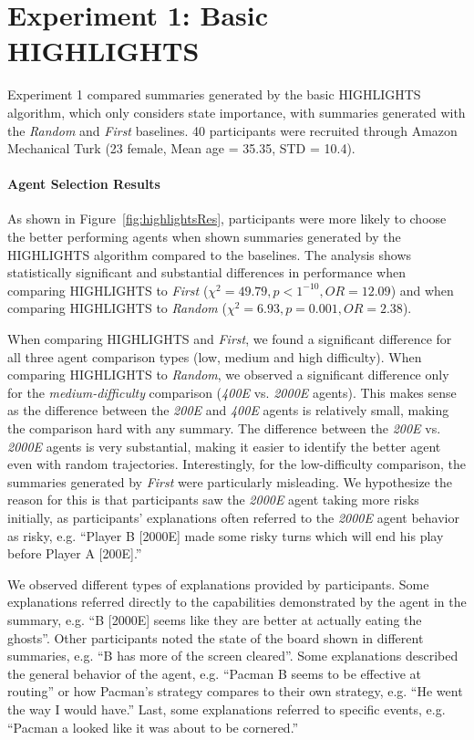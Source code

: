 \section{Experiment 1: Basic HIGHLIGHTS}
Experiment 1 compared summaries generated by the basic HIGHLIGHTS algorithm, which only considers state importance, with summaries generated with the \emph{Random} and \emph{First} baselines. 40 participants were recruited through Amazon Mechanical Turk (23 female, Mean age = 35.35, STD = 10.4).  


\paragraph{Agent Selection Results}
\label{sec:exp1res}
As shown in Figure~\ref{fig:highlightsRes}, participants were more likely to choose the better performing agents when shown summaries generated by the HIGHLIGHTS algorithm compared to the baselines. The analysis shows statistically significant and substantial differences in performance when comparing HIGHLIGHTS to  \emph{First} ($\chi^2=49.79, p<1^{-10}, OR = 12.09$) and when comparing HIGHLIGHTS to \emph{Random} ($\chi^2=6.93, p=0.001, OR = 2.38$). 

When comparing HIGHLIGHTS and \emph{First}, we found a  significant difference for all three agent comparison types (low, medium and high difficulty). When comparing HIGHLIGHTS to \emph{Random}, we observed a significant difference only for the \emph{medium-difficulty} comparison (\emph{400E} vs. \emph{2000E} agents). This makes sense as the difference between the \emph{200E} and \emph{400E} agents is relatively small, making the comparison hard with any summary. The difference between the \emph{200E} vs. \emph{2000E} agents is very substantial, making it easier to identify the better agent even with random trajectories. Interestingly, for the low-difficulty comparison, the summaries generated by \emph{First} were particularly misleading. We hypothesize the reason for this is that participants saw the \emph{2000E} agent taking more risks initially, as participants' explanations often referred to the \emph{2000E} agent behavior as risky, e.g. ``Player B [2000E] made some risky turns which will end his play before Player A [200E].'' 

We observed different types of explanations provided by participants. Some explanations referred directly to the capabilities demonstrated by the agent in the summary, e.g. ``B [2000E] seems like they are better at actually eating the ghosts''. Other participants noted the state of the board shown in different summaries, e.g. ``B has more of the screen cleared''. Some explanations described the general behavior of the agent, e.g. ``Pacman B seems to be effective at routing'' or how Pacman's strategy compares to their own strategy, e.g. ``He went the way I would have.'' Last, some explanations referred to specific events, e.g. ``Pacman a looked like it was about to be cornered.'' 


